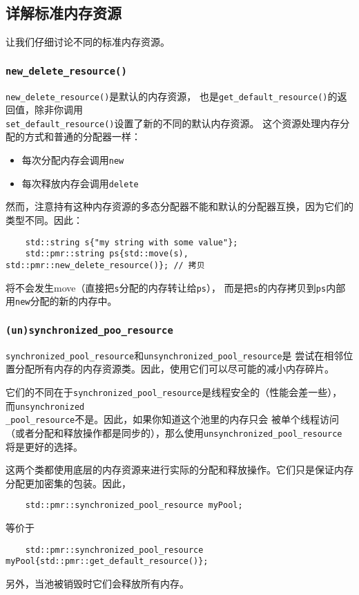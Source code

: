 \subsection{详解标准内存资源}
让我们仔细讨论不同的标准内存资源。

\subsubsection{\texttt{new\_delete\_resource()}}
\texttt{new\_delete\_resource()}是默认的内存资源，
也是\texttt{get\_default\_resource()}的返回值，除非你调用\\
\texttt{set\_default\_resource()}设置了新的不同的默认内存资源。
这个资源处理内存分配的方式和普通的分配器一样：
\begin{itemize}
    \item 每次分配内存会调用\texttt{new}
    \item 每次释放内存会调用\texttt{delete}
\end{itemize}
然而，注意持有这种内存资源的多态分配器不能和默认的分配器互换，因为它们的类型不同。因此：
\begin{lstlisting}
    std::string s{"my string with some value"};
    std::pmr::string ps{std::move(s), std::pmr::new_delete_resource()}; // 拷贝
\end{lstlisting}
将不会发生move（直接把\texttt{s}分配的内存转让给\texttt{ps}），
而是把\texttt{s}的内存拷贝到\texttt{ps}内部用\texttt{new}分配的新的内存中。

\subsubsection{\texttt{(un)synchronized\_poo\_resource}}
\texttt{synchronized\_pool\_resource}和\texttt{unsynchronized\_pool\_resource}是
尝试在相邻位置分配所有内存的内存资源类。因此，使用它们可以尽可能的减小内存碎片。

它们的不同在于\texttt{synchronized\_pool\_resource}是线程安全的（性能会差一些），
而\texttt{unsynchronized\\
\_pool\_resource}不是。因此，如果你知道这个池里的内存只会
被单个线程访问（或者分配和释放操作都是同步的），那么使用\texttt{unsynchronized\_pool\_resource}
将是更好的选择。

这两个类都使用底层的内存资源来进行实际的分配和释放操作。它们只是保证内存分配更加密集的包装。因此，
\begin{lstlisting}
    std::pmr::synchronized_pool_resource myPool;
\end{lstlisting}
等价于
\begin{lstlisting}
    std::pmr::synchronized_pool_resource myPool{std::pmr::get_default_resource()};
\end{lstlisting}
另外，当池被销毁时它们会释放所有内存。

